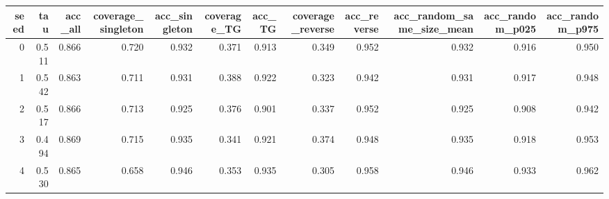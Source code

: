 \begin{tabular}{rrrrrrrrrrrr}
\toprule
seed & tau & acc_all & coverage_singleton & acc_singleton & coverage_TG & acc_TG & coverage_reverse & acc_reverse & acc_random_same_size_mean & acc_random_p025 & acc_random_p975 \\
\midrule
0 & 0.511 & 0.866 & 0.720 & 0.932 & 0.371 & 0.913 & 0.349 & 0.952 & 0.932 & 0.916 & 0.950 \\
1 & 0.542 & 0.863 & 0.711 & 0.931 & 0.388 & 0.922 & 0.323 & 0.942 & 0.931 & 0.917 & 0.948 \\
2 & 0.517 & 0.866 & 0.713 & 0.925 & 0.376 & 0.901 & 0.337 & 0.952 & 0.925 & 0.908 & 0.942 \\
3 & 0.494 & 0.869 & 0.715 & 0.935 & 0.341 & 0.921 & 0.374 & 0.948 & 0.935 & 0.918 & 0.953 \\
4 & 0.530 & 0.865 & 0.658 & 0.946 & 0.353 & 0.935 & 0.305 & 0.958 & 0.946 & 0.933 & 0.962 \\
\bottomrule
\end{tabular}
